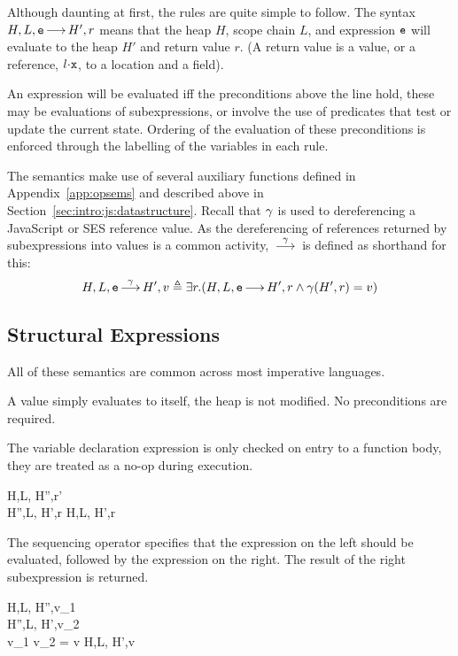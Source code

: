 \documentclass[a4paper,notitlepage]{report}
\begin{document}
  Although daunting at first, the rules are quite simple to follow. The syntax
  $H,L,\mathtt{e} {\,\longrightarrow\,} H',r$ means that the heap $H$, scope chain $L$, and
  expression $\mathtt{e}$ will evaluate to the heap $H'$ and return value $r$. (A
  return value is a value, or a reference, $\fld{l}{\js{x}}$, to a location and
  a field).

  An expression will be evaluated iff the preconditions above the line hold,
  these may be evaluations of subexpressions, or involve the use of predicates
  that test or update the current state.
  Ordering of the evaluation of these preconditions is enforced through the
  labelling of the variables in each rule.

  The semantics make use of several auxiliary functions defined in
  Appendix~\ref{app:opsems} and described above in
  Section~\ref{sec:intro:js:datastructure}. Recall that $\gamma$ is used to
  dereferencing a JavaScript or SES reference value.
  As the dereferencing of references returned by subexpressions into values is a
  common activity, $\overset{\gamma}{{\,\longrightarrow\,}}$ is defined as shorthand for this:
  \[ H,L,\mathtt{e} \overset{\gamma}{{\,\longrightarrow\,}} H',v \triangleq \exists r. (H,L,\mathtt{e} {\,\longrightarrow\,} H',r
  \wedge \gamma(H',r) = v) \]

  \subsection{Structural Expressions}
  \label{subsec:structuralexpressions}
  All of these semantics are common across most imperative languages.


  A value simply evaluates to itself, the heap is not modified. No preconditions
  are required.


  The variable declaration expression is only checked on entry to a function
  body, they are treated as a no-op during execution.

    {H,L, \evalsto H'',r' \\
     H'',L, \evalsto H',r}
   {H,L, \evalsto H',r}
  \nopagebreak

  The sequencing operator specifies that the expression on the left should be
  evaluated, followed by the expression on the right. The result of the right
  subexpression is returned.

    {H,L, \gevalsto H'',v_1 \\
     H'',L, \gevalsto H',v_2\\
     v_1 \oplus v_2 = v}
   {H,L, \evalsto H',v}
\end{document}
